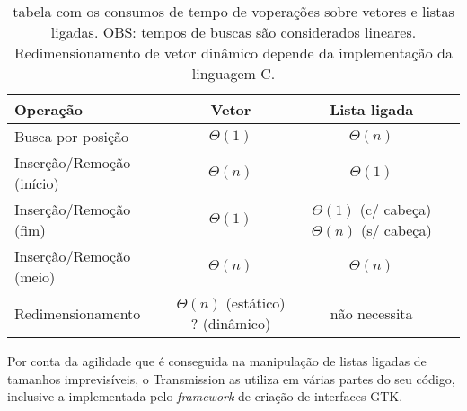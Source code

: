 \begin{table}
    \centering
    \begin{tabular}{| l | c | c | c |}
        \hline
        \textbf{Operação} & \textbf{Vetor} & \textbf{Lista ligada} \\
        \hline
        Busca por posição & $\Theta(1)$ & $\Theta(n)$ \\
        \hline
        Inserção/Remoção (início) & $\Theta(n)$ & $\Theta(1)$ \\
        \hline
        Inserção/Remoção (fim) & $\Theta(1)$ & \parbox[t]{.3\textwidth}{\centering $\Theta(1)$ (c/ cabeça) \\ $\Theta(n)$ (s/ cabeça)} \\
        \hline
        Inserção/Remoção (meio) & $\Theta(n)$ & $\Theta(n)$ \\
        \hline
        Redimensionamento & \parbox[t]{.25\textwidth}{\centering $\Theta(n)$ (estático) \\ ? (dinâmico)} & não necessita \\
        \hline
    \end{tabular}
    \caption{tabela com os consumos de tempo de voperações sobre vetores e listas
    ligadas. OBS: tempos de buscas são considerados lineares. Redimensionamento de vetor
    dinâmico depende da implementação da linguagem C.}
\end{table}

Por conta da agilidade que é conseguida na manipulação de listas ligadas de tamanhos
imprevisíveis, o Transmission as utiliza em várias partes do seu código, inclusive a
implementada pelo \emph{framework} de criação de interfaces GTK.